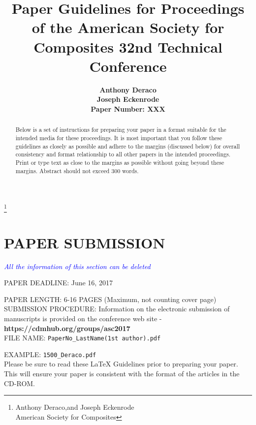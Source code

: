 \documentclass[]{asc}
\begin{document}
\title{Paper Guidelines for Proceedings of the American Society for Composites 32nd Technical Conference}
\author{\bf Anthony Deraco\\ \bf Joseph Eckenrode \\ Paper Number: XXX}


\maketitle

\begin{abstract}

Below is a set of instructions for preparing your paper in a format suitable for the intended media for these proceedings. It is most important that you follow these guidelines as closely as possible and adhere to the margins (discussed below) for overall consistency and format relationship to all other papers in the intended proceedings. Print or type text as close to the margins as possible without going beyond these margins. Abstract should not exceed 300 words.



\end{abstract}

\let\thefootnote\relax\footnote{
\fontsize{10}{12}\selectfont
Anthony Deraco,and Joseph Eckenrode \\ American Society for Composites}

\section*{PAPER SUBMISSION}

\textcolor{blue}{\it All the information of this section can be deleted}

PAPER DEADLINE: June 16, 2017

PAPER LENGTH: 6-16 PAGES (Maximum, not counting cover page)\\ 


SUBMISSION PROCEDURE: Information on the electronic submission of
manuscripts is provided on the conference web site - 
\textbf{https://cdmhub.org/groups/asc2017}\\

FILE NAME: \texttt{PaperNo\_LastName(1st author).pdf}

EXAMPLE: \texttt{1500\_Deraco.pdf}\\

Please be sure to read these LaTeX Guidelines prior to preparing your paper. This will ensure your paper is consistent with the format of the articles in the CD-ROM. \\
\end{document}
